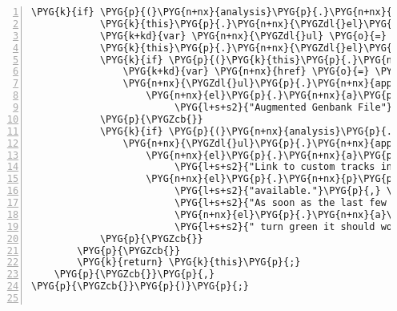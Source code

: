 \begin{Verbatim}[commandchars=\\\{\},numbers=left,firstnumber=1,stepnumber=5]
        \PYG{k}{if} \PYG{p}{(}\PYG{n+nx}{analysis}\PYG{p}{.}\PYG{n+nx}{hg\PYGZus{}url} \PYG{o}{\textbar{}\textbar{}} \PYG{k}{this}\PYG{p}{.}\PYG{n+nx}{augmented\PYGZus{}gb}\PYG{p}{)} \PYG{p}{\PYGZob{}}
            \PYG{k}{this}\PYG{p}{.}\PYG{n+nx}{\PYGZdl{}el}\PYG{p}{.}\PYG{n+nx}{append}\PYG{p}{(}\PYG{n+nx}{el}\PYG{p}{.}\PYG{n+nx}{h2}\PYG{p}{(}\PYG{l+s+s2}{"Results"}\PYG{p}{)}\PYG{p}{)}\PYG{p}{;}
            \PYG{k+kd}{var} \PYG{n+nx}{\PYGZdl{}ul} \PYG{o}{=} \PYG{n+nx}{\PYGZdl{}}\PYG{p}{(}\PYG{n+nx}{el}\PYG{p}{.}\PYG{n+nx}{ul}\PYG{p}{(}\PYG{p}{)}\PYG{p}{)}
            \PYG{k}{this}\PYG{p}{.}\PYG{n+nx}{\PYGZdl{}el}\PYG{p}{.}\PYG{n+nx}{append}\PYG{p}{(}\PYG{n+nx}{\PYGZdl{}ul}\PYG{p}{[}\PYG{l+m+mi}{0}\PYG{p}{]}\PYG{p}{)}\PYG{p}{;}
            \PYG{k}{if} \PYG{p}{(}\PYG{k}{this}\PYG{p}{.}\PYG{n+nx}{augmented\PYGZus{}gb}\PYG{p}{)} \PYG{p}{\PYGZob{}}
                \PYG{k+kd}{var} \PYG{n+nx}{href} \PYG{o}{=} \PYG{n+nx}{\PYGZus{}id} \PYG{o}{+} \PYG{l+s+s1}{'/files/'} \PYG{o}{+} \PYG{k}{this}\PYG{p}{.}\PYG{n+nx}{augmented\PYGZus{}gb}\PYG{p}{.}\PYG{n+nx}{get}\PYG{p}{(}\PYG{l+s+s1}{'path'}\PYG{p}{)}\PYG{p}{;}
                \PYG{n+nx}{\PYGZdl{}ul}\PYG{p}{.}\PYG{n+nx}{append}\PYG{p}{(}\PYG{n+nx}{el}\PYG{p}{.}\PYG{n+nx}{li}\PYG{p}{(}
                    \PYG{n+nx}{el}\PYG{p}{.}\PYG{n+nx}{a}\PYG{p}{(}\PYG{p}{\PYGZob{}}\PYG{n+nx}{href}\PYG{o}{:} \PYG{n+nx}{href}\PYG{p}{\PYGZcb{}}\PYG{p}{,}
                         \PYG{l+s+s2}{"Augmented Genbank File"}\PYG{p}{)}\PYG{p}{)}\PYG{p}{)}\PYG{p}{;}
            \PYG{p}{\PYGZcb{}}
            \PYG{k}{if} \PYG{p}{(}\PYG{n+nx}{analysis}\PYG{p}{.}\PYG{n+nx}{hg\PYGZus{}url}\PYG{p}{)} \PYG{p}{\PYGZob{}}
                \PYG{n+nx}{\PYGZdl{}ul}\PYG{p}{.}\PYG{n+nx}{append}\PYG{p}{(}\PYG{n+nx}{el}\PYG{p}{.}\PYG{n+nx}{li}\PYG{p}{(}
                    \PYG{n+nx}{el}\PYG{p}{.}\PYG{n+nx}{a}\PYG{p}{(}\PYG{p}{\PYGZob{}}\PYG{n+nx}{href}\PYG{o}{:} \PYG{n+nx}{analysis}\PYG{p}{.}\PYG{n+nx}{hg\PYGZus{}url}\PYG{p}{\PYGZcb{}}\PYG{p}{,}
                         \PYG{l+s+s2}{"Link to custom tracks in UCSC browser"}\PYG{p}{)}\PYG{p}{,}
                    \PYG{n+nx}{el}\PYG{p}{.}\PYG{n+nx}{p}\PYG{p}{(}\PYG{l+s+s2}{"It might take a minute until the tracks become "} \PYG{o}{+}
                         \PYG{l+s+s2}{"available."}\PYG{p}{,} \PYG{n+nx}{el}\PYG{p}{.}\PYG{n+nx}{br}\PYG{p}{(}\PYG{p}{)}\PYG{p}{,}
                         \PYG{l+s+s2}{"As soon as the last few items "}\PYG{p}{,}
                         \PYG{n+nx}{el}\PYG{p}{.}\PYG{n+nx}{a}\PYG{p}{(}\PYG{p}{\PYGZob{}}\PYG{n+nx}{href}\PYG{o}{:} \PYG{n+nx}{galaxy\PYGZus{}history\PYGZus{}url}\PYG{p}{\PYGZcb{}}\PYG{p}{,} \PYG{l+s+s2}{"here"}\PYG{p}{)}\PYG{p}{,}
                         \PYG{l+s+s2}{" turn green it should work."}\PYG{p}{)}\PYG{p}{)}\PYG{p}{)}\PYG{p}{;}
            \PYG{p}{\PYGZcb{}}
        \PYG{p}{\PYGZcb{}}
        \PYG{k}{return} \PYG{k}{this}\PYG{p}{;}
    \PYG{p}{\PYGZcb{}}\PYG{p}{,}
\PYG{p}{\PYGZcb{}}\PYG{p}{)}\PYG{p}{;}


\end{Verbatim}
